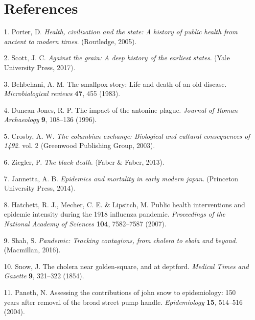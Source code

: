 \documentclass[
]{article}
\newenvironment{cslreferences}%
  {}%
  {\par}
\begin{document}
\hypertarget{references}{%
\section*{References}\label{references}}

\hypertarget{refs}{}
\begin{cslreferences}
\leavevmode\hypertarget{ref-porter2005health}{}%
1. Porter, D. \emph{Health, civilization and the state: A history of public health from ancient to modern times}. (Routledge, 2005).

\leavevmode\hypertarget{ref-scott2017against}{}%
2. Scott, J. C. \emph{Against the grain: A deep history of the earliest states}. (Yale University Press, 2017).

\leavevmode\hypertarget{ref-behbehani1983smallpox}{}%
3. Behbehani, A. M. The smallpox story: Life and death of an old disease. \emph{Microbiological reviews} \textbf{47}, 455 (1983).

\leavevmode\hypertarget{ref-duncan1996impact}{}%
4. Duncan-Jones, R. P. The impact of the antonine plague. \emph{Journal of Roman Archaeology} \textbf{9}, 108--136 (1996).

\leavevmode\hypertarget{ref-crosby2003columbian}{}%
5. Crosby, A. W. \emph{The columbian exchange: Biological and cultural consequences of 1492}. vol. 2 (Greenwood Publishing Group, 2003).

\leavevmode\hypertarget{ref-ziegler2013black}{}%
6. Ziegler, P. \emph{The black death}. (Faber \& Faber, 2013).

\leavevmode\hypertarget{ref-jannetta2014epidemics}{}%
7. Jannetta, A. B. \emph{Epidemics and mortality in early modern japan}. (Princeton University Press, 2014).

\leavevmode\hypertarget{ref-hatchett2007public}{}%
8. Hatchett, R. J., Mecher, C. E. \& Lipsitch, M. Public health interventions and epidemic intensity during the 1918 influenza pandemic. \emph{Proceedings of the National Academy of Sciences} \textbf{104}, 7582--7587 (2007).

\leavevmode\hypertarget{ref-shah2016pandemic}{}%
9. Shah, S. \emph{Pandemic: Tracking contagions, from cholera to ebola and beyond}. (Macmillan, 2016).

\leavevmode\hypertarget{ref-snow1854cholera}{}%
10. Snow, J. The cholera near golden-square, and at deptford. \emph{Medical Times and Gazette} \textbf{9}, 321--322 (1854).

\leavevmode\hypertarget{ref-paneth2004assessing}{}%
11. Paneth, N. Assessing the contributions of john snow to epidemiology: 150 years after removal of the broad street pump handle. \emph{Epidemiology} \textbf{15}, 514--516 (2004).


\end{cslreferences}
\end{document}
